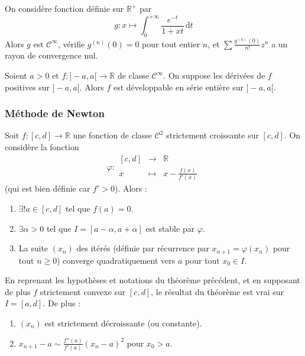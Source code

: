 	\begin{cexample}
		On considère fonction définie sur $\mathbb{R}^+$ par
		\[ g : x \mapsto \int_0^{+\infty} \frac{e^{-t}}{1+xt} \, \mathrm{d}t \]
		Alors $g$ est $\mathcal{C}^\infty$, vérifie $g^{(n)}(0) = 0$ pour tout entier $n$, et $\sum \frac{g^{(n)}(0)}{n!} z^n$ a un rayon de convergence nul.
	\end{cexample}
	
	
	\begin{theorem}[Bernstein]
		Soient $a > 0$ et $f : ]-a,a[ \rightarrow \mathbb{R}$ de classe $\mathcal{C}^\infty$. On suppose les dérivées de $f$ positives sur $]-a,a[$. Alors $f$ est développable en série entière sur $]-a,a[$.
	\end{theorem}
	
	\subsubsection{Méthode de Newton}
	
	
	\begin{theorem}
		Soit $f : [c, d] \rightarrow \mathbb{R}$ une fonction de classe $\mathcal{C}^2$ strictement croissante sur $[c, d]$. On considère la fonction
		\[ \varphi :
		\begin{array}{ccc}
			[c, d] &\rightarrow& \mathbb{R} \\
			x &\mapsto& x - \frac{f(x)}{f'(x)}
		\end{array}
		\]
		(qui est bien définie car $f' > 0$). Alors :
		\begin{enumerate}[label=(\roman*)]
			\item $\exists! a \in [c, d]$ tel que $f(a) = 0$.
			\item $\exists \alpha > 0$ tel que $I = [a - \alpha, a + \alpha]$ est stable par $\varphi$.
			\item La suite $(x_n)$ des itérés (définie par récurrence par $x_{n+1} = \varphi(x_n)$ pour tout $n \geq 0$) converge quadratiquement vers $a$ pour tout $x_0 \in I$.
		\end{enumerate}
	\end{theorem}
	
	\begin{corollary}
		En reprenant les hypothèses et notations du théorème précédent, et en supposant de plus $f$ strictement convexe sur $[c, d]$, le résultat du théorème est vrai sur $I = [a, d]$. De plus :
		\begin{enumerate}[label=(\roman*)]
			\item $(x_n)$ est strictement décroissante (ou constante).
			\item $x_{n+1} - a \sim \frac{f''(a)}{f'(a)} (x_n - a)^2$ pour $x_0 > a$.
		\end{enumerate}
	\end{corollary}
	
